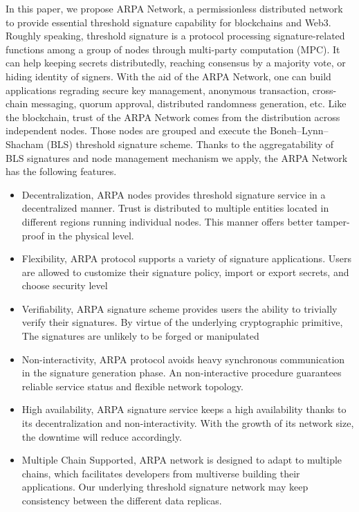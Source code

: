 \documentclass[11pt]{article}
\begin{document}
In this paper, we propose ARPA Network, a permissionless distributed network to provide essential threshold signature capability for blockchains and Web3. Roughly speaking, threshold signature is a protocol processing signature-related functions among a group of nodes through multi-party computation (MPC). It can help keeping secrets distributedly, reaching consensus by a majority vote, or hiding identity of signers. With the aid of the ARPA Network, one can build applications regrading secure key management, anonymous transaction, cross-chain messaging, quorum approval, distributed randomness generation, etc. Like the blockchain, trust of the ARPA Network comes from the distribution across independent nodes. Those nodes are grouped and execute the Boneh–Lynn–Shacham (BLS) threshold signature scheme. Thanks to the aggregatability of BLS signatures and node management mechanism we apply, the ARPA Network has the following features.
\begin{itemize}
    \item Decentralization, ARPA nodes provides threshold signature service in a decentralized manner. Trust is distributed to multiple entities located in different regions running individual nodes. This manner offers better tamper-proof in the physical level.
    \item Flexibility, ARPA protocol supports a variety of signature applications. Users are allowed to customize their signature policy, import or export secrets, and choose security level
    \item Verifiability, ARPA signature scheme provides users the ability to trivially verify their signatures. By virtue of the underlying cryptographic primitive, The signatures are unlikely to be forged or manipulated
    \item Non-interactivity, ARPA protocol avoids heavy synchronous communication in the signature generation phase. An non-interactive procedure guarantees reliable service status and flexible network topology.
    \item High availability, ARPA signature service keeps a high availability thanks to its decentralization and non-interactivity. With the growth of its network size, the downtime will reduce accordingly.
    \item Multiple Chain Supported, ARPA network is designed to adapt to multiple chains, which facilitates developers from multiverse building their applications. Our underlying threshold signature network may keep consistency between the different data replicas.
\end{itemize}
\end{document}

